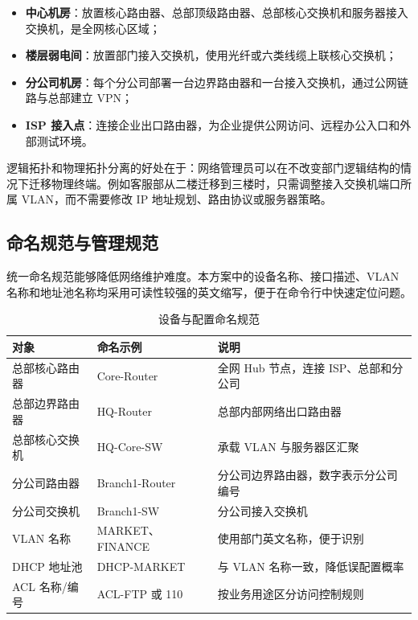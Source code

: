 \documentclass[12pt,a4paper]{ctexart}
\begin{document}
\begin{itemize}
    \item \textbf{中心机房}：放置核心路由器、总部顶级路由器、总部核心交换机和服务器接入交换机，是全网核心区域；
    \item \textbf{楼层弱电间}：放置部门接入交换机，使用光纤或六类线缆上联核心交换机；
    \item \textbf{分公司机房}：每个分公司部署一台边界路由器和一台接入交换机，通过公网链路与总部建立 VPN；
    \item \textbf{ISP 接入点}：连接企业出口路由器，为企业提供公网访问、远程办公入口和外部测试环境。
\end{itemize}

逻辑拓扑和物理拓扑分离的好处在于：网络管理员可以在不改变部门逻辑结构的情况下迁移物理终端。例如客服部从二楼迁移到三楼时，只需调整接入交换机端口所属 VLAN，而不需要修改 IP 地址规划、路由协议或服务器策略。

\subsection{命名规范与管理规范}

统一命名规范能够降低网络维护难度。本方案中的设备名称、接口描述、VLAN 名称和地址池名称均采用可读性较强的英文缩写，便于在命令行中快速定位问题。

\begin{table}[H]
\centering
\caption{设备与配置命名规范}
\label{tab:naming-rule}
\begin{tabular}{|p{3cm}|p{4cm}|p{6cm}|}
\hline
\textbf{对象} & \textbf{命名示例} & \textbf{说明} \\ \hline
总部核心路由器 & Core-Router & 全网 Hub 节点，连接 ISP、总部和分公司 \\ \hline
总部边界路由器 & HQ-Router & 总部内部网络出口路由器 \\ \hline
总部核心交换机 & HQ-Core-SW & 承载 VLAN 与服务器区汇聚 \\ \hline
分公司路由器 & Branch1-Router & 分公司边界路由器，数字表示分公司编号 \\ \hline
分公司交换机 & Branch1-SW & 分公司接入交换机 \\ \hline
VLAN 名称 & MARKET、FINANCE & 使用部门英文名称，便于识别 \\ \hline
DHCP 地址池 & DHCP-MARKET & 与 VLAN 名称一致，降低误配置概率 \\ \hline
ACL 名称/编号 & ACL-FTP 或 110 & 按业务用途区分访问控制规则 \\ \hline
\end{tabular}
\end{table}
\end{document}
